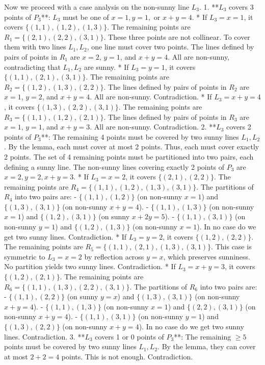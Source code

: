    Now we proceed with a case analysis on the non-sunny line $L_3$.
    1.  **$L_3$ covers 3 points of $P_3$**: $L_3$ must be one of $x=1, y=1,$ or $x+y=4$.
        *   If $L_3=x=1$, it covers $\{(1,1),(1,2),(1,3)\}$. The remaining points are $R_1 = \{(2,1),(2,2),(3,1)\}$. These three points are not collinear. To cover them with two lines $L_1, L_2$, one line must cover two points. The lines defined by pairs of points in $R_1$ are $x=2$, $y=1$, and $x+y=4$. All are non-sunny, contradicting that $L_1, L_2$ are sunny.
        *   If $L_3=y=1$, it covers $\{(1,1),(2,1),(3,1)\}$. The remaining points are $R_2 = \{(1,2),(1,3),(2,2)\}$. The lines defined by pairs of points in $R_2$ are $x=1$, $y=2$, and $x+y=4$. All are non-sunny. Contradiction.
        *   If $L_3=x+y=4$, it covers $\{(1,3),(2,2),(3,1)\}$. The remaining points are $R_3 = \{(1,1),(1,2),(2,1)\}$. The lines defined by pairs of points in $R_3$ are $x=1$, $y=1$, and $x+y=3$. All are non-sunny. Contradiction.
    2.  **$L_3$ covers 2 points of $P_3$**: The remaining 4 points must be covered by two sunny lines $L_1, L_2$. By the lemma, each must cover at most 2 points. Thus, each must cover exactly 2 points. The set of 4 remaining points must be partitioned into two pairs, each defining a sunny line. The non-sunny lines covering exactly 2 points of $P_3$ are $x=2, y=2, x+y=3$.
        *   If $L_3=x=2$, it covers $\{(2,1),(2,2)\}$. The remaining points are $R_4 = \{(1,1),(1,2),(1,3),(3,1)\}$. The partitions of $R_4$ into two pairs are:
            - $\{(1,1),(1,2)\}$ (on non-sunny $x=1$) and $\{(1,3),(3,1)\}$ (on non-sunny $x+y=4$).
            - $\{(1,1),(1,3)\}$ (on non-sunny $x=1$) and $\{(1,2),(3,1)\}$ (on sunny $x+2y=5$).
            - $\{(1,1),(3,1)\}$ (on non-sunny $y=1$) and $\{(1,2),(1,3)\}$ (on non-sunny $x=1$).
            In no case do we get two sunny lines. Contradiction.
        *   If $L_3=y=2$, it covers $\{(1,2),(2,2)\}$. The remaining points are $R_5 = \{(1,1),(2,1),(1,3),(3,1)\}$. This case is symmetric to $L_3=x=2$ by reflection across $y=x$, which preserves sunniness. No partition yields two sunny lines. Contradiction.
        *   If $L_3=x+y=3$, it covers $\{(1,2),(2,1)\}$. The remaining points are $R_6 = \{(1,1),(1,3),(2,2),(3,1)\}$. The partitions of $R_6$ into two pairs are:
            - $\{(1,1),(2,2)\}$ (on sunny $y=x$) and $\{(1,3),(3,1)\}$ (on non-sunny $x+y=4$).
            - $\{(1,1),(1,3)\}$ (on non-sunny $x=1$) and $\{(2,2),(3,1)\}$ (on non-sunny $x+y=4$).
            - $\{(1,1),(3,1)\}$ (on non-sunny $y=1$) and $\{(1,3),(2,2)\}$ (on non-sunny $x+y=4$).
            In no case do we get two sunny lines. Contradiction.
    3.  **$L_3$ covers 1 or 0 points of $P_3$**: The remaining $\ge 5$ points must be covered by two sunny lines $L_1, L_2$. By the lemma, they can cover at most $2+2=4$ points. This is not enough. Contradiction.


